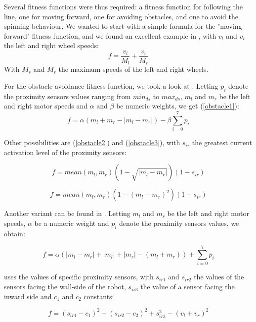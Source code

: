 \documentclass[lettersize,journal]{IEEEtran}
\begin{document}
\par
Several fitness functions were thus required: a fitness function for following the line, one for moving forward,  one for avoiding obstacles, and one to avoid the spinning behaviour.
We wanted to start with a simple formula for the "moving forward" fitness function, and we found an excellent example in \cite{ref8}, with $v_l$ and $v_r$ the left and right wheel speeds:
\begin{equation}
\label{forward1}
f = \frac{v_l}{M_l}+\frac{v_r}{M_r}
\end{equation}
With $M_s$ and $M_r$ the maximum speeds of the left and right wheels.
\par
For the obstacle avoidance fitness function, we took a look at \cite{ref2}.
Letting $p_i$ denote the proximity sensors values ranging from $min_{ds}$ to $max_{ds}$, $m_l$ and $m_r$ be the left and right motor speeds and $\alpha$ and $\beta$ be numeric weights, we get (\ref{obstacle1}):
\begin{equation}
\label{obstacle1}
f = \alpha (m_l+m_r-|m_l - m_r|) - \beta \sum_{i=0}^{7} p_i
\end{equation}

Other possibilities are (\ref{obstacle2}) and (\ref{obstacle3}), with $s_{ir}$ the greatest current activation level of the proximity sensors:

\begin{equation}
\label{obstacle2}
f = mean(m_l,m_r)(1- \sqrt{|m_l-m_r|})(1-s_{ir})
\end{equation}

\begin{equation}
\label{obstacle3}
f = mean(m_l,m_r)(1- (m_l-m_r)^2)(1-s_{ir})
\end{equation}

Another variant can be found in \cite{ref3}. Letting $m_l$ and $m_r$ be the left and right motor speeds, $\alpha$ be a numeric weight and $p_i$ denote the proximity sensors values, we obtain:

\begin{equation}
\label{obstacle4}
f = \alpha (|m_l-m_r|+ |m_l| + |m_r| - (m_l + m_r)) + \sum_{i=0}^{7} p_i
\end{equation}

\cite{ref7} uses the values of specific proximity sensors, with $s_{ir1}$ and $s_{ir2}$ the values of the sensors facing the wall-side of the robot, $s_{ir3}$ the value of a sensor facing the inward side and $c_1$ and $c_2$ constants:

\begin{equation}
\label{obstacle5}
f = (s_{ir1} - c_1)^2 + (s_{ir2} - c_2)^2 + s_{ir3}^2 - (v_l + v_r)^2
\end{equation}
\end{document}
